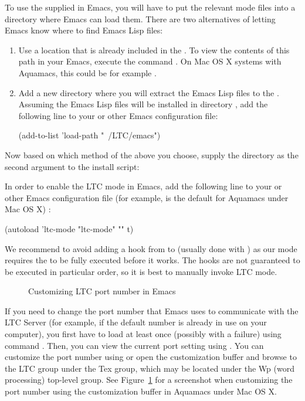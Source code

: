 To use the supplied  in Emacs, you will have to put the relevant mode files into a directory where Emacs can load them. There are two alternatives of letting Emacs know where to find Emacs Lisp files:
\begin{enumerate}
\item Use a location that is already included in the . To view the contents of this path in your Emacs, execute the command .  On Mac OS X systems with Aquamacs, this could be for example .
\item Add a new directory where you will extract the Emacs Lisp files to the . Assuming the Emacs Lisp files will be installed in directory , add the following line to your  or other Emacs configuration file:
  \begin{CodeVerbatim}
(add-to-list 'load-path "~/LTC/emacs")
  \end{CodeVerbatim}
\end{enumerate}

Now based on which method of the above you choose, supply the directory  as the second argument to the install script:

In order to enable the LTC mode in Emacs, add the following line to your  or other Emacs configuration file (for example,  is the default for Aquamacs under Mac OS X) :
\begin{CodeVerbatim}
(autoload 'ltc-mode "ltc-mode" "" t)
\end{CodeVerbatim}

We recommend to avoid adding a hook from  to  (usually done with ) as our mode requires the  to be fully executed before it works. The hooks are not guaranteed to be executed in particular order, so it is best to manually invoke LTC mode.

\begin{figure}[t]
\centering
{}
\caption{Customizing LTC port number in Emacs} \label{fig:emacs-port}
\end{figure}

If you need to change the port number that Emacs uses to communicate with the LTC Server (for example, if the default number is already in use on your computer), you first have to load  at least once (possibly with a failure) using command .  Then, you can view the current port setting using .  You can customize the port number using  or open the customization buffer and browse to the LTC group under the Tex group, which may be located under the Wp (word processing) top-level group.  See Figure~\ref{fig:emacs-port} for a screenshot when customizing the port number using the customization buffer in Aquamacs under Mac OS X.

